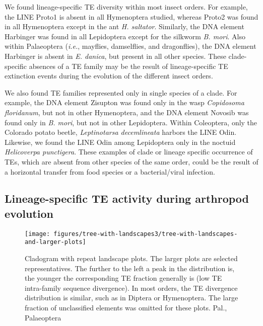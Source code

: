 We found lineage-specific TE diversity within most insect orders. For
example, the LINE Proto1 is absent in all Hymenoptera studied, whereas
Proto2 was found in all Hymenoptera except in the ant \emph{H.
saltator}. Similarly, the DNA element Harbinger was found in all
Lepidoptera except for the silkworm \emph{B. mori}. Also within
Palaeoptera (\emph{i.e.}, mayflies, damselflies, and dragonflies), the
DNA element Harbinger is absent in \emph{E. danica}, but present in all
other species. These clade-specific absences of a TE family may be the
result of lineage-specific TE extinction events during the evolution of
the different insect orders.

We also found TE families represented only in single species of a clade.
For example, the DNA element Zisupton was found only in the wasp
\emph{Copidosoma floridanum}, but not in other Hymenoptera, and the DNA
element Novosib was found only in \emph{B. mori}, but not in other
Lepidoptera. Within Coleoptera, only the Colorado potato beetle,
\emph{Leptinotarsa decemlineata} harbors the LINE Odin. Likewise, we
found the LINE Odin among Lepidoptera only in the noctuid
\emph{Helicoverpa punctigera}. These examples of clade or lineage
specific occurrence of TEs, which are absent from other species of the
same order, could be the result of a horizontal transfer from food
species or a bacterial/viral infection.



\subsection{Lineage-specific TE activity during arthropod
evolution}\label{lineage-specific-te-activity-during-arthropod-evolution}

\begin{figure}[h!]
\begin{center}
\texttt{[image: figures/tree-with-landscapes3/tree-with-landscapes-and-larger-plots]}
\caption[Arthropod repeat landscapes]{{Cladogram with repeat landscape
plots. The larger plots are selected representatives. The further to the
left a peak in the distribution is, the younger the corresponding TE
fraction generally is (low TE intra-family sequence divergence). In most
orders, the TE divergence distribution is similar, such as in Diptera or
Hymenoptera. The large fraction of unclassified elements was omitted for
these plots. Pal., Palaeoptera%
}}
\end{center}
\end{figure}


